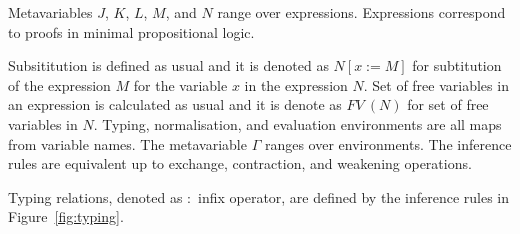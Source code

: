 \documentclass[11p,a4paper]{article}
\newcommand{\sbs}[3]{#1[#2:=#3]}
\newcommand{\fv}[1]{FV\ (#1)}
\begin{document}
Metavariables $J$, $K$, $L$, $M$, and $N$ range over
expressions. Expressions correspond to proofs in minimal propositional
logic.

Subsititution is defined as usual and it is denoted as
$\sbs{N}{x}{M}$ for subtitution of the expression $M$ for the
variable $x$ in the expression $N$. Set of free variables in an
expression is calculated as usual and it is denote as $\fv{N}$ for
set of free variables in $N$.
Typing, normalisation, and evaluation environments are all maps from
variable names. The metavariable $\Gamma$ ranges over environments.
The inference rules are equivalent up to exchange, contraction, and
weakening operations.

Typing relations, denoted as $:$ infix operator, are defined by
the inference rules in Figure~\ref{fig:typing}.
\end{document}
